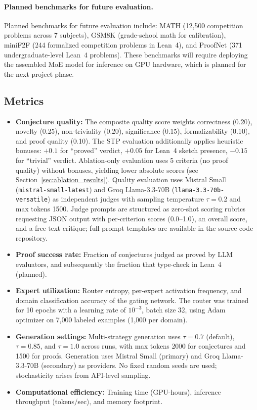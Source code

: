 \documentclass[11pt,a4paper]{article}
\begin{document}
\paragraph{Planned benchmarks for future evaluation.}
Planned benchmarks for future evaluation include: MATH \citep{hendrycks2021measuring} (12,500 competition problems across 7 subjects), GSM8K \citep{cobbe2021gsm8k} (grade-school math for calibration), miniF2F \citep{zheng2022minif2f} (244 formalized competition problems in Lean~4), and ProofNet \citep{azerbayev2023proofnet} (371 undergraduate-level Lean~4 problems). These benchmarks will require deploying the assembled MoE model for inference on GPU hardware, which is planned for the next project phase.

\subsection{Metrics}

\begin{itemize}[leftmargin=*]
    \item \textbf{Conjecture quality:} The composite quality score weights correctness (0.20), novelty (0.25), non-triviality (0.20), significance (0.15), formalizability (0.10), and proof quality (0.10). The STP evaluation additionally applies heuristic bonuses: $+0.1$ for ``proved'' verdict, $+0.05$ for Lean~4 sketch presence, $-0.15$ for ``trivial'' verdict. Ablation-only evaluation uses 5 criteria (no proof quality) without bonuses, yielding lower absolute scores (see Section~\ref{sec:ablation_results}). Quality evaluation uses Mistral Small (\texttt{mistral-small-latest}) and Groq Llama-3.3-70B (\texttt{llama-3.3-70b-versatile}) as independent judges with sampling temperature $\tau = 0.2$ and max tokens 1500. Judge prompts are structured as zero-shot scoring rubrics requesting JSON output with per-criterion scores (0.0--1.0), an overall score, and a free-text critique; full prompt templates are available in the source code repository.
    \item \textbf{Proof success rate:} Fraction of conjectures judged as proved by LLM evaluators, and subsequently the fraction that type-check in Lean~4 (planned).
    \item \textbf{Expert utilization:} Router entropy, per-expert activation frequency, and domain classification accuracy of the gating network. The router was trained for 10 epochs with a learning rate of $10^{-3}$, batch size 32, using Adam optimizer on 7,000 labeled examples (1,000 per domain).
    \item \textbf{Generation settings:} Multi-strategy generation uses $\tau = 0.7$ (default), $\tau = 0.85$, and $\tau = 1.0$ across runs, with max tokens 2000 for conjectures and 1500 for proofs. Generation uses Mistral Small (primary) and Groq Llama-3.3-70B (secondary) as providers. No fixed random seeds are used; stochasticity arises from API-level sampling.
    \item \textbf{Computational efficiency:} Training time (GPU-hours), inference throughput (tokens/sec), and memory footprint.
\end{itemize}
\end{document}

